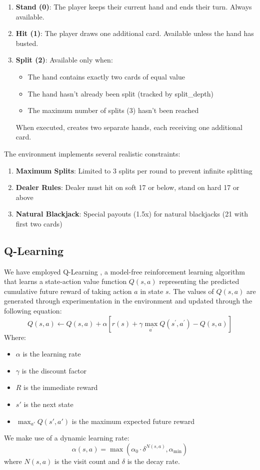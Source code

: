 \documentclass[10pt]{article}
\theoremstyle{definition}
\begin{document}
\begin{enumerate}
    \item \textbf{Stand (0)}: The player keeps their current hand and ends their turn. Always available.

    \item \textbf{Hit (1)}: The player draws one additional card. Available unless the hand has busted.

    \item \textbf{Split (2)}: Available only when:
    \begin{itemize}
        \item The hand contains exactly two cards of equal value
        \item The hand hasn't already been split (tracked by split\_depth)
        \item The maximum number of splits (3) hasn't been reached
    \end{itemize}
    When executed, creates two separate hands, each receiving one additional card.
\end{enumerate}

The environment implements several realistic constraints:

\begin{enumerate}
    \item \textbf{Maximum Splits}: Limited to 3 splits per round to prevent infinite splitting
    \item \textbf{Dealer Rules}: Dealer must hit on soft 17 or below, stand on hard 17 or above
    \item \textbf{Natural Blackjack}: Special payouts (1.5x) for natural blackjacks (21 with first two cards)
\end{enumerate}
\subsection{Q-Learning}
We have employed Q-Learning \cite{watkins1992qlearning}, a model-free reinforcement learning algorithm that learns a state-action value function \(Q(s,a)\)
representing the predicted cumulative future reward of taking action \(a\) in state \(s\). 
The values of \(Q(s,a)\) are generated through experimentation in the environment and updated through the following equation:
\[Q(s,a)\leftarrow Q(s,a)+\alpha[r(s)+\gamma\max_{a^\prime}Q(s^\prime,a^\prime)-Q(s,a)]\]
Where:
\begin{itemize}
    \item $\alpha$ is the learning rate
    \item $\gamma$ is the discount factor
    \item $R$ is the immediate reward
    \item $s'$ is the next state
    \item $\max_{a'} Q(s',a')$ is the maximum expected future reward
\end{itemize}
We make use of a dynamic learning rate: 
\[\alpha(s,a) = \max(\alpha_0 \cdot \delta^{N(s,a)}, \alpha_{\min})\]
where \(N(s,a)\) is the visit count and \(\delta\) is the decay rate.
\end{document}
